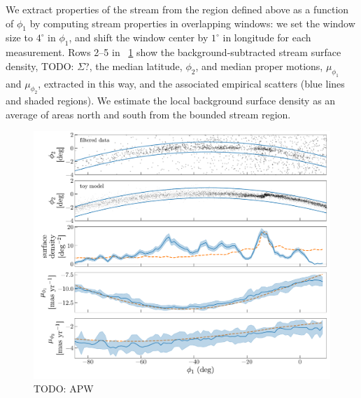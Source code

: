 \documentclass[modern]{aastex62}
\newcommand{\todo}[1]{{\color{red} TODO: #1}}
\begin{document}
We extract properties of the stream from the region defined above as a function
of $\phi_1$ by computing stream properties in overlapping windows:
we set the window size to $4^\circ$ in $\phi_1$, and shift the window center by
$1^\circ$ in longitude for each measurement.
Rows 2--5 in \figurename~\ref{fig:track-and-model} show the background-subtracted
stream surface density, \todo{$\Sigma$?}, the median latitude, $\phi_2$, and median proper motions,
$\mu_{\phi_1}$ and $\mu_{\phi_2}$, extracted in this way, and the associated empirical scatters
(blue lines and shaded regions).
We estimate the local background surface density as an average of areas north and south from the bounded stream region.

\begin{figure}
\begin{center}
\includegraphics[width=\textwidth]{track_observables.pdf}
\end{center}
\caption{%
\todo{APW}
}
\label{fig:track-and-model}
\end{figure}
\end{document}
